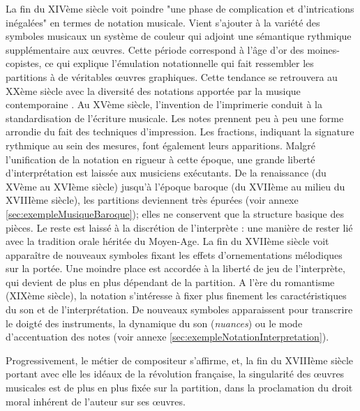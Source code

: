 La fin du XIVème siècle voit poindre "une phase de complication et d'intrications inégalées" \cite[43]{bosseur2005} en termes de notation musicale. Vient s'ajouter à la variété des symboles musicaux un système de couleur qui adjoint une sémantique rythmique supplémentaire aux œuvres.
Cette période correspond à l'âge d'or des moines-copistes, ce qui explique l'émulation notationnelle qui fait ressembler les partitions à de véritables œuvres graphiques. Cette tendance se retrouvera au XXème siècle avec la diversité des notations apportée par la musique contemporaine \cite[44]{bosseur2005}. 
Au XVème siècle, l'invention de l'imprimerie conduit à la standardisation de l'écriture musicale. Les notes prennent peu à peu une forme arrondie du fait des techniques d'impression. Les fractions, indiquant la signature rythmique au sein des mesures, font également leurs apparitions. 
Malgré l'unification de la notation en rigueur à cette époque, une grande liberté d'interprétation est laissée aux musiciens exécutants. De la renaissance (du XVème au XVIème siècle) jusqu'à l'époque baroque (du XVIIème au milieu du XVIIIème siècle), les partitions deviennent très épurées (voir annexe \ref{sec:exempleMusiqueBaroque}); elles ne conservent que la structure basique des pièces. Le reste est laissé à la discrétion de l'interprète : une manière de rester lié avec la tradition orale héritée du Moyen-Age.
La fin du XVIIème siècle voit apparaître de nouveaux symboles fixant les effets d'ornementations mélodiques sur la portée. Une moindre place est accordée à la liberté de jeu de l'interprète, qui devient de plus en plus dépendant de la partition.
A l'ère du romantisme (XIXème siècle), la notation s'intéresse à fixer plus finement les caractéristiques du son et de l'interprétation. De nouveaux symboles apparaissent pour transcrire le doigté des instruments, la dynamique du son (\textit{nuances}) ou le mode d'accentuation des notes (voir annexe \ref{sec:exempleNotationInterpretation}).

Progressivement, le métier de compositeur s'affirme, et, la fin du XVIIIème siècle portant avec elle les idéaux de la révolution française, la singularité des œuvres musicales est de plus en plus fixée sur la partition, dans la proclamation du droit moral inhérent de l'auteur sur ses œuvres.


